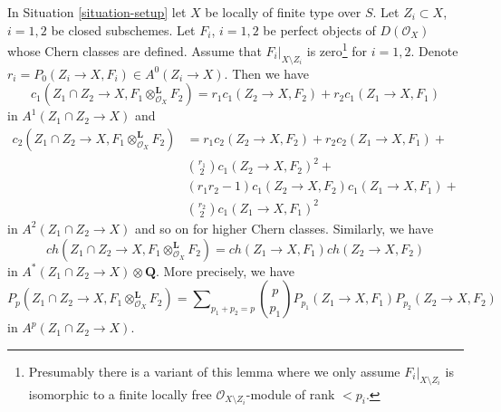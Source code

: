 \begin{lemma}
\label{lemma-loc-chern-tensor-product}
In Situation \ref{situation-setup} let $X$ be locally of finite type over $S$.
Let $Z_i \subset X$, $i = 1, 2$ be closed subschemes. Let $F_i$, $i = 1, 2$
be perfect objects of $D(\mathcal{O}_X)$ whose Chern classes are defined.
Assume that $F_i|_{X \setminus Z_i}$ is zero\footnote{Presumably there
is a variant of this lemma where we only assume $F_i|_{X \setminus Z_i}$
is isomorphic to a finite locally free $\mathcal{O}_{X \setminus Z_i}$-module
of rank $< p_i$.} for $i = 1, 2$. Denote
$r_i = P_0(Z_i \to X, F_i) \in A^0(Z_i \to X)$.
Then we have
$$
c_1(Z_1 \cap Z_2 \to X, F_1 \otimes_{\mathcal{O}_X}^\mathbf{L} F_2) =
r_1 c_1(Z_2 \to X, F_2) + r_2 c_1(Z_1 \to X, F_1)
$$
in $A^1(Z_1 \cap Z_2 \to X)$ and
\begin{align*}
c_2(Z_1 \cap Z_2 \to X, F_1 \otimes_{\mathcal{O}_X}^\mathbf{L} F_2)
& =
r_1 c_2(Z_2 \to X, F_2) +
r_2 c_2(Z_1 \to X, F_1) + \\
& {r_1 \choose 2} c_1(Z_2 \to X, F_2)^2 + \\
& (r_1r_2 - 1) c_1(Z_2 \to X, F_2)c_1(Z_1 \to X, F_1) + \\
& {r_2 \choose 2} c_1(Z_1 \to X, F_1)^2
\end{align*}
in $A^2(Z_1 \cap Z_2 \to X)$ and so on for higher Chern classes.
Similarly, we have
$$
ch(Z_1 \cap Z_2 \to X, F_1 \otimes_{\mathcal{O}_X}^\mathbf{L} F_2) =
ch(Z_1 \to X, F_1) ch(Z_2 \to X, F_2)
$$
in $A^*(Z_1 \cap Z_2 \to X) \otimes \mathbf{Q}$. More precisely, we have
$$
P_p(Z_1 \cap Z_2 \to X, F_1 \otimes_{\mathcal{O}_X}^\mathbf{L} F_2) =
\sum\nolimits_{p_1 + p_2 = p}
{p \choose p_1} P_{p_1}(Z_1 \to X, F_1) P_{p_2}(Z_2 \to X, F_2)
$$
in $A^p(Z_1 \cap Z_2 \to X)$.
\end{lemma}

